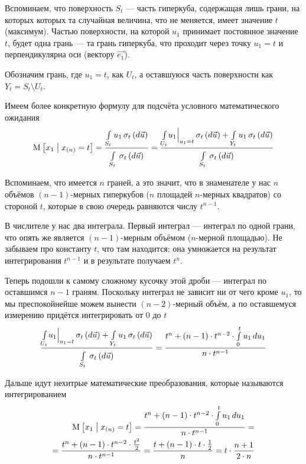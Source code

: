 Вспоминаем, что поверхность $S_t$ --- часть гиперкуба,
содержащая лишь грани, на которых которых та случайная величина,
что не меняется, имеет значение $t$ (максимум).
Частью поверхности, на которой $u_1$ принимает постоянное значение $t$,
будет одна грань --- та грань гиперкуба, что проходит через точку $u_1 = t$
и перпендикулярна оси (вектору $\vec{e_1}$).

Обозначим грань, где $u_1 = t$, как $U_t$,
а оставшуюся часть поверхности как $Y_t = S_t \setminus U_t$.

Имеем более конкретную формулу для подсчёта условного математического ожидания
\begin{align*}
  \Mean{x_1 \mcond x_{\left( n \right)} = t}
  = \frac{\integrall{S_t}{\sigma_{t}\left(d\vec{u} \right)}{u_1}}{
      \integrall{S_t}{\sigma_{t}\left(d\vec{u} \right)}{}}
  = \frac{\integrall{U_t}{\sigma_{t}\left(d\vec{u} \right)}{
      \Bigl. u_1 \Bigr|_{u_1 = t}}
      + \integrall{Y_t}{\sigma_{t}\left(d\vec{u} \right)}{
      u_1}}{
      \integrall{S_t}{\sigma_{t}\left(d\vec{u} \right)}{}}
\end{align*}

Вспоминаем, что имеется $n$ граней, а это значит, что в знаменателе
у нас $n$ объёмов $\left( n-1 \right)$-мерных гиперкубов
($n$ площадей $n$-мерных квадратов)
со стороной $t$, которые в свою очередь равняются числу $t^{n-1}$.

В числителе у нас два интеграла.
Первый интеграл --- интеграл по одной грани, что опять же является
$\left( n-1 \right)$-мерным объёмом ($n$-мерной площадью).
Не забываем про константу $t$, что там находится: она умножается
на результат интегрирования $t^{n-1}$ и в результате получаем $t^n$.

Теперь подошли к самому сложному кусочку этой дроби ---
интеграл по оставшимся $n-1$ граням.
Поскольку интеграл не зависит ни от чего кроме $u_1$, то мы преспокойнейше
можем вынести $\left( n-2 \right)$-мерный объём, а по оставшемуся измерению
придётся интегрировать от $0$ до $t$
$$\frac{\integrall{U_t}{\sigma_{t}\left(d\vec{u} \right)}{
      \Bigl. u_1 \Bigr|_{u_1 = t}}
      + \integrall{Y_t}{\sigma_{t}\left(d\vec{u} \right)}{
      u_1}}{
      \integrall{S_t}{\sigma_{t}\left(d\vec{u} \right)}{}}
  = \frac{t^n + \left( n-1 \right) \cdot t^{n-2}
      \cdot \integral{0}{t}{u_1}{u_1}}{n \cdot t^{n-1}}$$

Дальше идут нехитрые математические преобразования,
которые называются интегрированием
\begin{align*}
  \Mean{x_1 \mcond x_{\left( n \right)} = t}
  = \frac{t^n + \left( n-1 \right) \cdot t^{n-2} 
      \cdot \integral{0}{t}{u_1}{u_1}}{n \cdot t^{n-1}} = \\
  = \frac{t^n + \left( n-1 \right) \cdot t^{n-2}
      \cdot \frac{t^2}{2}}{n \cdot t^{n-1}}
  = \frac{t + \left( n-1 \right) \cdot t \cdot \frac{1}{2}}{n}
  = t \cdot \frac{n+1}{2 \cdot n}
\end{align*}

